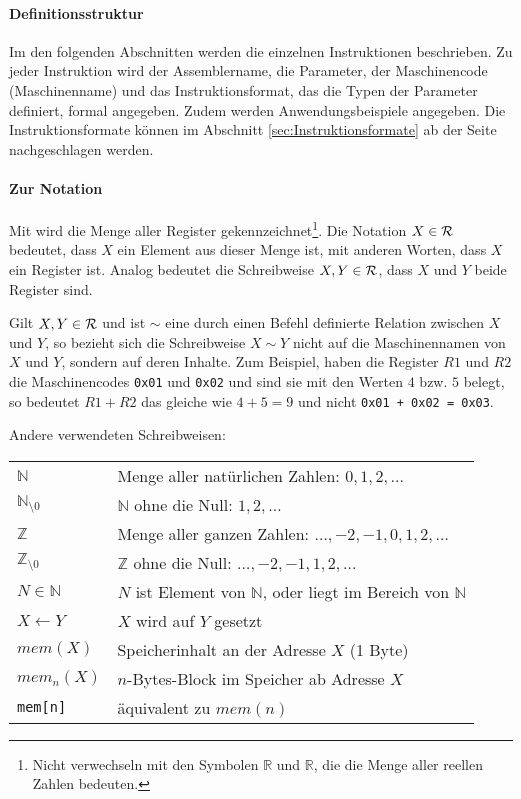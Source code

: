 \paragraph{Definitionsstruktur}
Im den folgenden Abschnitten werden die einzelnen Instruktionen beschrieben. Zu
jeder Instruktion wird der \gls{Assemblername}, die Parameter, der Maschinencode
(\gls{Maschinenname}) und das Instruktionsformat, das die Typen der Parameter
definiert, formal angegeben. Zudem werden Anwendungsbeispiele angegeben. Die
Instruktionsformate können im Abschnitt \ref{sec:Instruktionsformate} ab der
Seite \pageref{sec:Instruktionsformate} nachgeschlagen werden.

\paragraph{Zur Notation}
Mit \Reg\index{\Reg} wird die Menge aller Register
gekennzeichnet\footnote{Nicht verwechseln mit den Symbolen $\mathds{R}$ und
$\mathbb{R}$, die die Menge aller reellen Zahlen bedeuten.}.
Die Notation $X \in \mathcal{R}$ bedeutet, dass $X$ ein Element aus dieser Menge ist,
mit anderen Worten, dass $X$ ein Register ist. Analog bedeutet die
Schreibweise $X,Y \in \mathcal{R}$, dass $X$ und $Y$ beide Register sind.

Gilt $X, Y\in \mathcal{R}$ und ist $\sim$ eine durch einen Befehl definierte Relation
zwischen $X$ und $Y$, so bezieht sich die Schreibweise $X \sim Y$ nicht auf die
Maschinennamen von $X$ und $Y$, sondern auf deren Inhalte. Zum Beispiel, haben
die Register $R1$ und $R2$ die Maschinencodes \texttt{0x01} und \texttt{0x02}
und sind sie mit den Werten $4$ bzw. $5$ belegt, so bedeutet $R1 + R2$ das
gleiche wie $4 + 5 = 9$ und nicht \texttt{0x01 + 0x02 = 0x03}.

Andere verwendeten Schreibweisen:
\begin{center}
\begin{tabular}{l|l}\toprule
 $\mathds{N}$ & Menge aller natürlichen Zahlen: $0,1,2,\ldots$         \\
 $\mathds{N}_{\setminus 0}$ 
              & $\mathds{N}$ ohne die Null: $1,2,\ldots$               \\
 $\mathds{Z}$ & Menge aller ganzen Zahlen: $\ldots,-2,-1,0,1,2,\ldots$ \\
 $\mathds{Z}_{\setminus 0}$ 
              & $\mathds{Z}$ ohne die Null: $\ldots,-2,-1,1,2,\ldots$  \\
 $N \in \mathds{N}$
              & $N$ ist Element von $\mathds{N}$, oder liegt im Bereich von
              $\mathds{N}$                                             \\
 $X \gets Y$  & $X$ wird auf $Y$ gesetzt                               \\
 $mem(X)$     & Speicherinhalt an der Adresse $X$ (1 Byte)             \\
 $mem_{n}(X)$ & $n$-Bytes-Block im Speicher ab Adresse $X$             \\
 \texttt{mem[n]}
              & äquivalent zu $mem(n)$                                 \\
\bottomrule
\end{tabular}
\end{center} 
